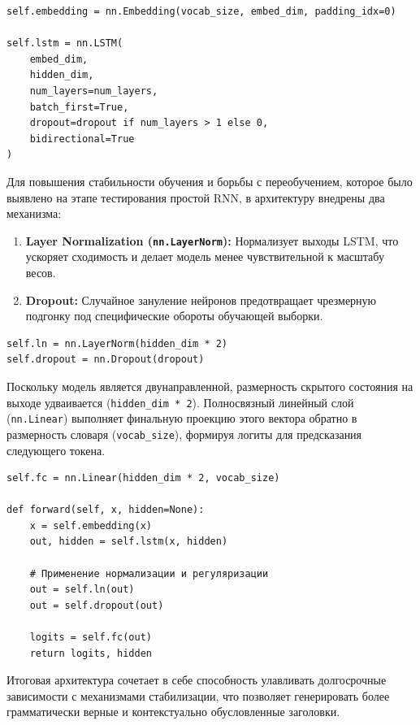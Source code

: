 \documentclass[coursework]{SCWorks}
\begin{document}
    \begin{verbatim}
self.embedding = nn.Embedding(vocab_size, embed_dim, padding_idx=0)

self.lstm = nn.LSTM(
    embed_dim,
    hidden_dim,
    num_layers=num_layers,
    batch_first=True,
    dropout=dropout if num_layers > 1 else 0,
    bidirectional=True
)
    \end{verbatim}

    Для повышения стабильности обучения и борьбы с переобучением, которое было выявлено на этапе тестирования простой RNN,
    в архитектуру внедрены два механизма:
    \begin{enumerate}
        \item \textbf{Layer Normalization (\texttt{nn.LayerNorm}):} Нормализует выходы LSTM, что ускоряет сходимость и делает модель менее чувствительной к масштабу весов.
        \item \textbf{Dropout:} Случайное зануление нейронов предотвращает чрезмерную подгонку под специфические обороты обучающей выборки.
    \end{enumerate}

    \begin{verbatim}
self.ln = nn.LayerNorm(hidden_dim * 2)
self.dropout = nn.Dropout(dropout)
    \end{verbatim}

    Поскольку модель является двунаправленной, размерность скрытого состояния на выходе удваивается (\texttt{hidden\_dim * 2}).
    Полносвязный линейный слой (\texttt{nn.Linear}) выполняет финальную проекцию этого вектора обратно в размерность словаря
    (\texttt{vocab\_size}), формируя логиты для предсказания следующего токена.

    \begin{verbatim}
self.fc = nn.Linear(hidden_dim * 2, vocab_size)

def forward(self, x, hidden=None):
    x = self.embedding(x)
    out, hidden = self.lstm(x, hidden)

    # Применение нормализации и регуляризации
    out = self.ln(out)
    out = self.dropout(out)

    logits = self.fc(out)
    return logits, hidden
    \end{verbatim}

    Итоговая архитектура сочетает в себе способность улавливать долгосрочные зависимости с механизмами стабилизации,
    что позволяет генерировать более грамматически верные и контекстуально обусловленные заголовки.
\end{document}

